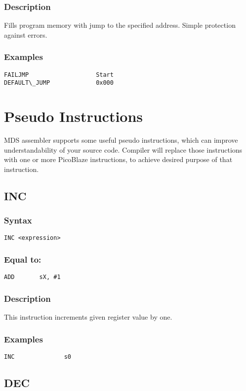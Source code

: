         \subsubsection{Description}
            Fills program memory with jump to the specified address. Simple protection against errors.

        \subsubsection{Examples}
            \verb'FAILJMP                   Start'\\
            \verb'DEFAULT\_JUMP             0x000'

\section{Pseudo Instructions}
    MDS assembler supports some useful pseudo instructions, which can improve understandability of your source code. Compiler will replace those instructions with one or more PicoBlaze instructions, to achieve desired purpose of that instruction.

    \subsection{INC}
        \subsubsection{Syntax}
            \verb'INC <expression>'

        \subsubsection{Equal to:}
            \verb'ADD       sX, #1'

        \subsubsection{Description}
            This instruction increments given register value by one.

        \subsubsection{Examples}
            \verb'INC              s0'

    \subsection{DEC}
